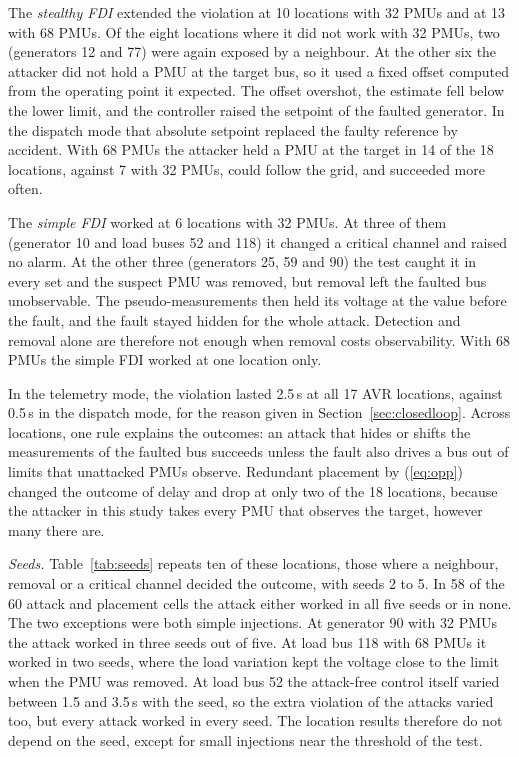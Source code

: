 \documentclass[journal]{IEEEtran}
\begin{document}
The \emph{stealthy FDI} extended the violation at 10 locations with 32 PMUs and at 13 with 68 PMUs. Of the eight locations where it did not work with 32 PMUs, two (generators 12 and 77) were again exposed by a neighbour. At the other six the attacker did not hold a PMU at the target bus, so it used a fixed offset computed from the operating point it expected. The offset overshot, the estimate fell below the lower limit, and the controller raised the setpoint of the faulted generator. In the dispatch mode that absolute setpoint replaced the faulty reference by accident. With 68 PMUs the attacker held a PMU at the target in 14 of the 18 locations, against 7 with 32 PMUs, could follow the grid, and succeeded more often.

The \emph{simple FDI} worked at 6 locations with 32 PMUs. At three of them (generator 10 and load buses 52 and 118) it changed a critical channel and raised no alarm. At the other three (generators 25, 59 and 90) the test caught it in every set and the suspect PMU was removed, but removal left the faulted bus unobservable. The pseudo-measurements then held its voltage at the value before the fault, and the fault stayed hidden for the whole attack. Detection and removal alone are therefore not enough when removal costs observability. With 68 PMUs the simple FDI worked at one location only.

In the telemetry mode, the violation lasted 2.5\,s at all 17 AVR locations, against 0.5\,s in the dispatch mode, for the reason given in Section~\ref{sec:closedloop}. Across locations, one rule explains the outcomes: an attack that hides or shifts the measurements of the faulted bus succeeds unless the fault also drives a bus out of limits that unattacked PMUs observe. Redundant placement by (\ref{eq:opp}) changed the outcome of delay and drop at only two of the 18 locations, because the attacker in this study takes every PMU that observes the target, however many there are.



\emph{Seeds.} Table~\ref{tab:seeds} repeats ten of these locations, those where a neighbour, removal or a critical channel decided the outcome, with seeds 2 to 5. In 58 of the 60 attack and placement cells the attack either worked in all five seeds or in none. The two exceptions were both simple injections. At generator 90 with 32 PMUs the attack worked in three seeds out of five. At load bus 118 with 68 PMUs it worked in two seeds, where the load variation kept the voltage close to the limit when the PMU was removed. At load bus 52 the attack-free control itself varied between 1.5 and 3.5\,s with the seed, so the extra violation of the attacks varied too, but every attack worked in every seed. The location results therefore do not depend on the seed, except for small injections near the threshold of the test.
\end{document}
